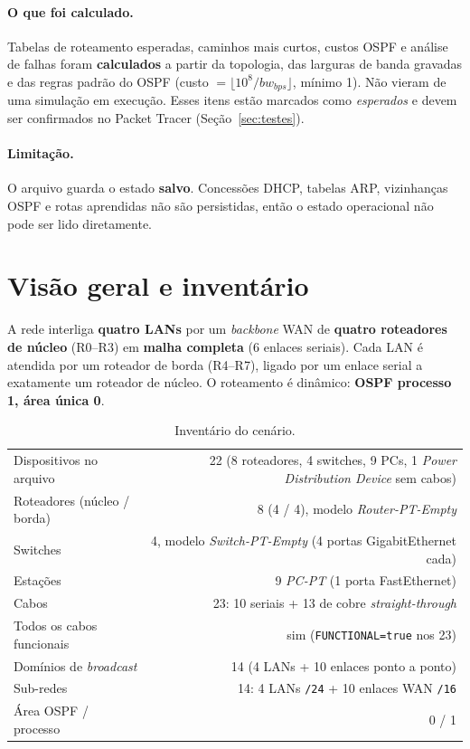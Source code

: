 \documentclass[12pt,a4paper]{article}
\begin{document}
\paragraph{O que foi calculado.} Tabelas de roteamento esperadas, caminhos mais curtos, custos OSPF e análise de falhas foram \textbf{calculados} a partir da topologia, das larguras de banda gravadas e das regras padrão do OSPF (custo $=\lfloor 10^8 / bw_{bps}\rfloor$, mínimo 1). Não vieram de uma simulação em execução. Esses itens estão marcados como \textit{esperados} e devem ser confirmados no Packet Tracer (Seção~\ref{sec:testes}).

\paragraph{Limitação.} O arquivo guarda o estado \textbf{salvo}. Concessões DHCP, tabelas ARP, vizinhanças OSPF e rotas aprendidas não são persistidas, então o estado operacional não pode ser lido diretamente.

\section{Visão geral e inventário}
A rede interliga \textbf{quatro LANs} por um \textit{backbone} WAN de \textbf{quatro roteadores de núcleo} (R0--R3) em \textbf{malha completa} (6 enlaces seriais). Cada LAN é atendida por um roteador de borda (R4--R7), ligado por um enlace serial a exatamente um roteador de núcleo. O roteamento é dinâmico: \textbf{OSPF processo 1, área única 0}.

\begin{table}[H]\centering\small
\begin{tabular}{@{}lr@{}}\toprule
Dispositivos no arquivo & 22 (8 roteadores, 4 switches, 9 PCs, 1 \textit{Power Distribution Device} sem cabos)\\
Roteadores (núcleo / borda) & 8 (4 / 4), modelo \textit{Router-PT-Empty}\\
Switches & 4, modelo \textit{Switch-PT-Empty} (4 portas GigabitEthernet cada)\\
Estações & 9 \textit{PC-PT} (1 porta FastEthernet)\\
Cabos & 23: 10 seriais + 13 de cobre \textit{straight-through}\\
Todos os cabos funcionais & sim (\texttt{FUNCTIONAL=true} nos 23)\\
Domínios de \textit{broadcast} & 14 (4 LANs + 10 enlaces ponto a ponto)\\
Sub-redes & 14: 4 LANs \texttt{/24} + 10 enlaces WAN \texttt{/16}\\
Área OSPF / processo & 0 / 1\\ \bottomrule
\end{tabular}
\caption{Inventário do cenário.}
\end{table}
\end{document}
